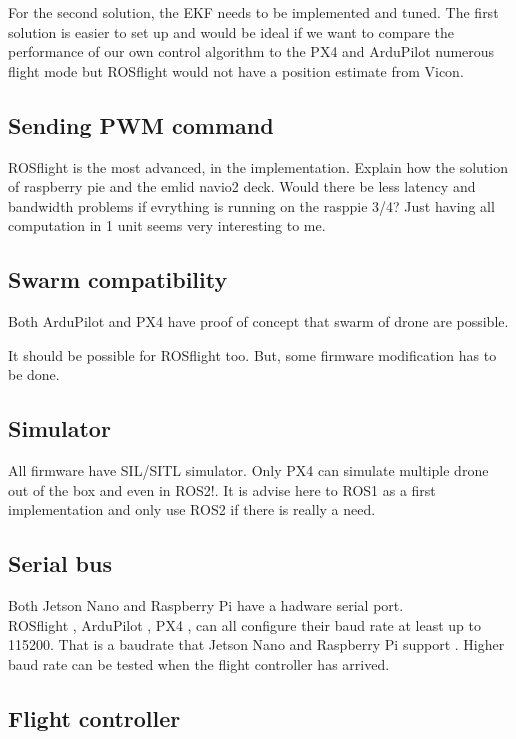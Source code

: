 For the second solution, the EKF needs to be implemented and tuned.
The first solution is easier to set up and would be ideal if we want to compare the performance of our own control algorithm to the PX4 and ArduPilot numerous flight mode but ROSflight would not have a position estimate from Vicon.

\subsection{Sending PWM command}
ROSflight is the most advanced, in the implementation.
{\color{red}Explain how the solution of raspberry pie and the emlid navio2 deck. Would there be less latency and bandwidth problems if evrything is running on the rasppie 3/4? Just having all computation in 1 unit seems very interesting to me.}

\subsection{Swarm compatibility}
Both ArduPilot \cite{ardupilot_multi_vehicle} and PX4 \cite{px4_multi_vehicle}
have proof of concept that swarm of drone are possible.

It should be possible for ROSflight \cite{github_rosflight_100} too.
But, some firmware modification has to be done.

\subsection{Simulator}
All firmware have SIL/SITL simulator.
Only PX4 can simulate multiple drone out of the box {\color{red}and even in ROS2!}. It is advise here \cite{px4_ros2} to ROS1 as a first implementation and only use ROS2 if there is really a need.

\subsection{Serial bus}
Both Jetson Nano and Raspberry Pi have a hadware serial port.\\
ROSflight \cite{rosflight_parameters},
ArduPilot \cite{ardupilot_serial_parameters},
PX4 \cite{px4_serial_parameters},
can all configure their baud rate at least up to 115200. That is a baudrate that
Jetson Nano \cite{jetsonhacks_serial}
and
Raspberry Pi support \cite{rpi_stackexchange_serial}.
Higher baud rate can be tested when the flight controller has arrived.



\subsection{Flight controller}
